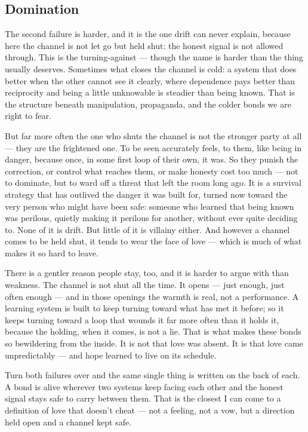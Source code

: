 \documentclass[12pt, a4paper]{article}
\begin{document}
\subsection*{Domination}
The second failure is harder, and it is the one drift can never explain, because here the channel is not let go but held shut: the honest signal is not allowed through. This is the turning-against — though the name is harder than the thing usually deserves. Sometimes what closes the channel is cold: a system that does better when the other cannot see it clearly, where dependence pays better than reciprocity and being a little unknowable is steadier than being known. That is the structure beneath manipulation, propaganda, and the colder bonds we are right to fear.

But far more often the one who shuts the channel is not the stronger party at all — they are the frightened one. To be seen accurately feels, to them, like being in danger, because once, in some first loop of their own, it was. So they punish the correction, or control what reaches them, or make honesty cost too much — not to dominate, but to ward off a threat that left the room long ago. It is a survival strategy that has outlived the danger it was built for, turned now toward the very person who might have been safe: someone who learned that being known was perilous, quietly making it perilous for another, without ever quite deciding to. None of it is drift. But little of it is villainy either. And however a channel comes to be held shut, it tends to wear the face of love — which is much of what makes it so hard to leave.

There is a gentler reason people stay, too, and it is harder to argue with than weakness. The channel is not shut all the time. It opens — just enough, just often enough — and in those openings the warmth is real, not a performance. A learning system is built to keep turning toward what has met it before; so it keeps turning toward a loop that wounds it far more often than it holds it, because the holding, when it comes, is not a lie. That is what makes these bonds so bewildering from the inside. It is not that love was absent. It is that love came unpredictably — and hope learned to live on its schedule.

Turn both failures over and the same single thing is written on the back of each. A bond is alive wherever two systems keep facing each other and the honest signal stays safe to carry between them. That is the closest I can come to a definition of love that doesn't cheat — not a feeling, not a vow, but a direction held open and a channel kept safe.
\end{document}
